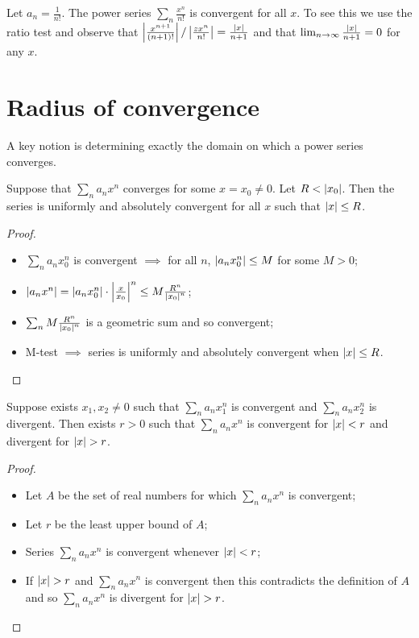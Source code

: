 \begin{example*}
  Let \(a_n = \frac{1}{n!}\).
  The power series \(\sum_{n}\frac{x^n}{n!}\) is convergent for all \(x\).
  To see this we use the ratio test and observe that  \(\left|\frac{x^{n+1}}{(n+1)!} \right|/ \left|\frac{zx^n}{n!}\right| = \frac{\left|x\right|}{n+1}\) and that \(\lim_{n\to\infty} \frac{\left|x\right|}{n+1} = 0 \) for any \(x\).
\end{example*}



\section{Radius of convergence}

A key notion is determining exactly the domain on which a power series converges.

\begin{theorem}
  Suppose that \(\sum_{n}a_n x^n\) converges for some \(x=x_0 \neq 0\).
  Let \(R<\left|x_0\right|\).
  Then the series is uniformly and absolutely convergent for all \(x\) such that \(\left|x\right|\leq R\).
\end{theorem}

\begin{proof}
  \begin{itemize}
    \item \(\sum_n a_n x_0^n\) is convergent \(\implies\) for all \(n\), \(\left|a_n x_0^n\right| \leq M\) for some \(M>0\);
    \item \(\left|a_n x^n\right| = \left|a_n x_0^n\right| \cdot \left|\frac{x}{x_0}\right|^n \leq M \frac{R^n}{\left|x_0\right|^n}\);
    \item \(\sum_n M \frac{R^n}{\left|x_0\right|^n}\) is a geometric sum and so convergent;
    \item M-test \(\implies\) series is uniformly and absolutely convergent when \(\left|x\right|\leq R\).  \qedhere
  \end{itemize}
\end{proof}




\begin{theorem}
  Suppose exists  \(x_1,x_2 \neq 0\) such that \(\sum_n a_n x_1^n\) is convergent and \(\sum_n a_n x_2^n\) is divergent.
  Then exists \(r>0\) such that \(\sum_n a_n x^n\) is convergent for \(\left|x\right|<r\) and divergent for \(\abs{x}>r\).
\end{theorem}

\begin{proof}
  \begin{itemize}
    \item Let \(A\) be the set of real numbers for which \(\sum_n a_n x^n\) is convergent;
    \item Let \(r\) be the least upper bound of \(A\);
    \item Series  \(\sum_n a_n x^n\) is convergent whenever \(\left|x\right|<r\);
    \item If \(\abs{x}>r\) and \(\sum_n a_n x^n\) is convergent then this contradicts the definition of \(A\) and so  \(\sum_n a_n x^n\) is divergent for \(\abs{x}>r\). \qedhere
  \end{itemize}
\end{proof}


